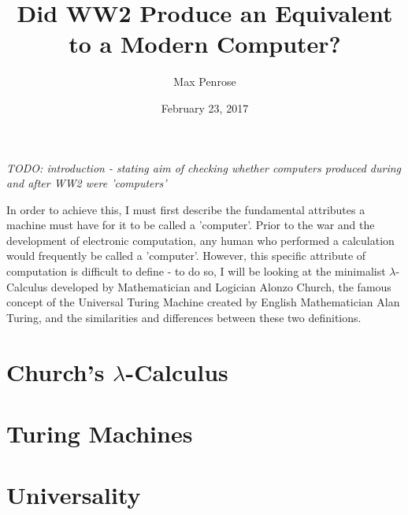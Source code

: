 \documentclass {article}
\title{Did WW2 Produce an Equivalent to a Modern Computer?}
\date{February 23, 2017}
\author{Max Penrose}
\begin{document}
\maketitle
\tableofcontents
\clearpage
\textit{TODO: introduction - stating aim of checking whether computers produced during and after WW2 were 'computers'}

In order to achieve this, I must first describe the fundamental attributes a machine must have for it to be called a 'computer'. Prior to the war and the development of electronic computation, any human who performed a calculation would  frequently be called a 'computer'. However, this specific attribute of computation is difficult to define - to do so, I will be looking at the minimalist  $\lambda$-Calculus developed by Mathematician and Logician Alonzo Church, the famous concept of the Universal Turing Machine created by English Mathematician Alan Turing, and the similarities and differences between these two definitions.

\section{Church's $\lambda$-Calculus}



\section{Turing Machines}



\section{Universality}


\end{document}
